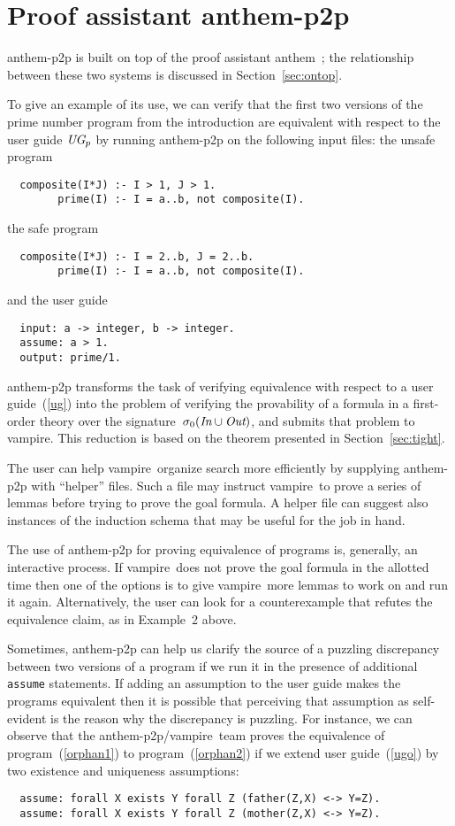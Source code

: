 \documentclass{article}
\def\anthem{{\sc anthem}}
\def\vampire{{\sc vampire}}
\begin{document}
\section{Proof assistant {\sc anthem-p2p}}

{\sc anthem-p2p} is built on top of the proof assistant \anthem\
\cite{fan20}; the relationship between these two systems is discussed in
Section~\ref{sec:ontop}.

To give an example of its use,
we can verify that the first two versions of the prime number program
from the introduction are equivalent with respect to the user guide
$\emph{UG}_p$ by running {\sc anthem-p2p} on the following input files: the
unsafe program
\begin{verbatim}
  composite(I*J) :- I > 1, J > 1.
        prime(I) :- I = a..b, not composite(I).
\end{verbatim}
the safe program
\begin{verbatim}
  composite(I*J) :- I = 2..b, J = 2..b.
        prime(I) :- I = a..b, not composite(I).
\end{verbatim}
and the user guide
\begin{verbatim}
  input: a -> integer, b -> integer.
  assume: a > 1.
  output: prime/1.
\end{verbatim}
{\sc anthem-p2p} transforms the task of verifying equivalence
with respect to a user guide~(\ref{ug}) into the problem of verifying
the provability of a formula in a first-order theory over the
signature~$\sigma_0(\emph{In}\cup\emph{Out})$,
and submits that problem to \vampire.  This reduction is based on the theorem
presented in Section~\ref{sec:tight}.

The user can help \vampire\ organize search more efficiently by
supplying {\sc anthem-p2p} with ``helper'' files.  Such a file may instruct
\vampire\ to prove a series of lemmas before trying to prove the goal formula.
A helper file can suggest also instances of the induction schema that may be
useful for the job in hand.

The use of {\sc anthem-p2p} for proving
equivalence of programs is, generally, an interactive process.
If \vampire\ does not prove the goal formula in the allotted time then one of
the options is to give \vampire\ more lemmas to work on and run it
again.  Alternatively, the user can look for a counterexample that refutes the
equivalence claim, as in Example~2 above.

Sometimes, {\sc anthem-p2p} can 
help us clarify the source of a puzzling discrepancy between two versions
of a program if we run it in the presence of additional \verb|assume|
statements.  If
adding an assumption to the user guide makes the programs equivalent then
it is possible that perceiving that assumption as self-evident
is the reason why the discrepancy is puzzling.  For
instance, we can observe that
the {\sc anthem-p2p}/\vampire\ team
proves the equivalence of
program~(\ref{orphan1}) to program~(\ref{orphan2}) if we extend user
guide~(\ref{ugo}) by two existence and uniqueness assumptions:
\begin{verbatim}
  assume: forall X exists Y forall Z (father(Z,X) <-> Y=Z).
  assume: forall X exists Y forall Z (mother(Z,X) <-> Y=Z).
\end{verbatim}
\end{document}
